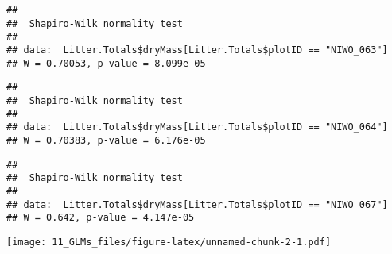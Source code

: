 \documentclass[
]{article}
\newenvironment{Shaded}{\begin{snugshade}}{\end{snugshade}}
\newcommand{\CommentTok}[1]{\textcolor[rgb]{0.56,0.35,0.01}{\textit{#1}}}
\newcommand{\KeywordTok}[1]{\textcolor[rgb]{0.13,0.29,0.53}{\textbf{#1}}}
\newcommand{\NormalTok}[1]{#1}
\newcommand{\OperatorTok}[1]{\textcolor[rgb]{0.81,0.36,0.00}{\textbf{#1}}}
\newcommand{\StringTok}[1]{\textcolor[rgb]{0.31,0.60,0.02}{#1}}
\begin{document}
\begin{verbatim}
## 
##  Shapiro-Wilk normality test
## 
## data:  Litter.Totals$dryMass[Litter.Totals$plotID == "NIWO_063"]
## W = 0.70053, p-value = 8.099e-05
\end{verbatim}

\begin{Shaded}
\end{Shaded}

\begin{verbatim}
## 
##  Shapiro-Wilk normality test
## 
## data:  Litter.Totals$dryMass[Litter.Totals$plotID == "NIWO_064"]
## W = 0.70383, p-value = 6.176e-05
\end{verbatim}

\begin{Shaded}
\end{Shaded}

\begin{verbatim}
## 
##  Shapiro-Wilk normality test
## 
## data:  Litter.Totals$dryMass[Litter.Totals$plotID == "NIWO_067"]
## W = 0.642, p-value = 4.147e-05
\end{verbatim}

\begin{Shaded}
\end{Shaded}

\texttt{[image: 11\_GLMs\_files/figure-latex/unnamed-chunk-2-1.pdf]}

\begin{Shaded}
\end{Shaded}
\end{document}
